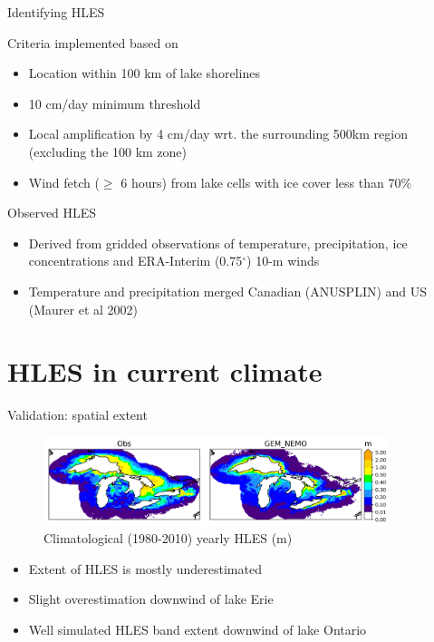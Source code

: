 \documentclass{beamer}
\begin{document}
  \begin{frame}{Identifying HLES}

        Criteria implemented based on \citet{Notaro:2015}
        \begin{itemize}
          \item Location within 100 km of lake shorelines
          \item 10 cm/day minimum threshold
          \item Local amplification by 4 cm/day wrt. the surrounding 500km region (excluding the 100 km zone)
          \item Wind fetch ($\geq$ 6 hours) from lake cells with ice cover less than 70\%
        \end{itemize}

        Observed HLES
        \begin{itemize}
          \item Derived from gridded observations of temperature, precipitation, ice concentrations and ERA-Interim (0.75$^\circ$) 10-m winds
          \item Temperature and precipitation merged Canadian (ANUSPLIN) and US (Maurer et al 2002)
        \end{itemize}

  \end{frame}


  \section{HLES in current climate}
  \begin{frame}{Validation: spatial extent}

      \begin{figure}
        \includegraphics[width=0.9\textwidth]{hles_clim_snow_fall_1980-2009.png}
        \caption{Climatological (1980-2010) yearly HLES (m)}
      \end{figure}

      \begin{itemize}
        \item Extent of HLES is mostly underestimated
        \item Slight overestimation downwind of lake Erie
        \item Well simulated HLES band extent downwind of lake Ontario
      \end{itemize}
  \end{frame}
\end{document}
